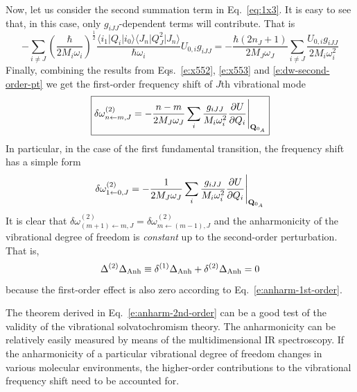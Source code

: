 \documentclass[b5paper,oneside,fleqn,11pt]{book}
\begin{document}
\begin{refsection}
Now, let us consider the second summation term in Eq.~\eqref{eq:1x3}.
It is easy to see that, in this case, only $g_{iJJ}$\hyp{}dependent terms will
contribute. That is
%
\begin{equation}  \label{e:x553}
-\sum_{i\ne J} \left( \frac{\hbar}{2M_i\omega_i} \right)^\frac{1}{2}  %
\frac{\langle i_1 \vert Q_i \vert i_0 \rangle 
      \langle J_n \vert Q_J^2 \vert J_n \rangle } {\hbar\omega_i}
U_{0,i} g_{iJJ} = 
-\frac{\hbar\left(2n_J+1\right)}{2M_J\omega_J} \sum_{i\ne J} \frac{U_{0,i} g_{iJJ}}{2M_i\omega_i^2}
\end{equation} 
%
Finally, combining the results from Eqs.~\eqref{e:x552}, \eqref{e:x553} and \eqref{e:dw-second-order-pt}
we get the first\hyp{}order frequency shift of $J$th vibrational mode
%
\begin{equation}   \label{e:buckingham-2st-order}
\boxed{
\delta \omega_{n\leftarrow m,J}^{(2)} = 
-\frac{n-m}{2M_J\omega_J} \sum_{i} \frac{g_{iJJ}}{M_i\omega_i^2} 
\frac{\partial U}{\partial Q_i} \Bigg|_{{\bf Q}_{0_A}}
}
\end{equation}
%
In particular, in the case of the first fundamental transition, the frequency shift 
has a simple form
%
\begin{equation}
\delta \omega_{1\leftarrow 0,J}^{(2)} = 
-\frac{1}{2M_J\omega_J} \sum_{i} \frac{g_{iJJ}}{M_i\omega_i^2} 
\frac{\partial U}{\partial Q_i} \Bigg|_{{\bf Q}_{0_A}}
\end{equation}
%
It is clear that $\delta \omega_{(m+1)\leftarrow m,J}^{(2)} = \delta \omega_{m\leftarrow (m-1),J}^{(2)}$
and the anharmonicity of the vibrational degree of freedom is \emph{constant}
up to the second\hyp{}order perturbation. That is,
%
\begin{equation}  \label{e:anharm-2nd-order}
\Delta^{(2)} \Delta_{\rm Anh} \equiv \delta^{(1)} \Delta_{\rm Anh} + \delta^{(2)} \Delta_{\rm Anh} =  0
\end{equation}
%
because the first\hyp{}order effect is also zero according to Eq.~\eqref{e:anharm-1st-order}. 

The theorem derived in Eq.~\eqref{e:anharm-2nd-order} can be a good test of the validity
of the vibrational solvatochromism theory. The anharmonicity can be relatively easily measured
by means of the multidimensional IR spectroscopy. If the anharmonicity of a particular vibrational 
degree of freedom changes in various molecular environments, the higher\hyp{}order contributions 
to the vibrational frequency shift need to be accounted for. 


\end{refsection}
\end{document}
